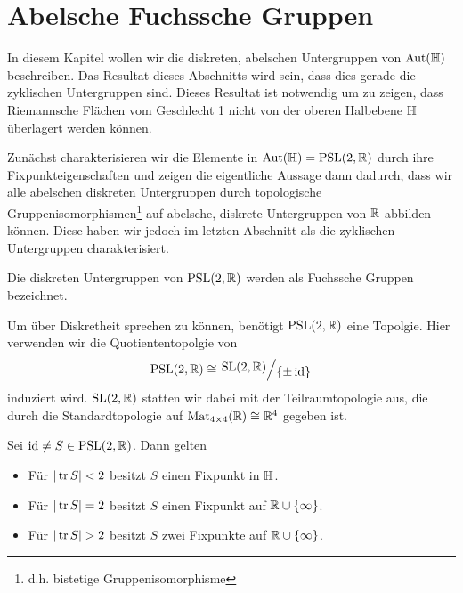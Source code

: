 
\section{Abelsche Fuchssche Gruppen}
\label{sec:fuchs}

In diesem Kapitel wollen wir die diskreten, abelschen Untergruppen von
$\operatorname{Aut}(\mathbb{H})$ beschreiben. Das Resultat dieses Abschnitts wird sein, dass
dies gerade die zyklischen Untergruppen sind. Dieses Resultat ist
notwendig um zu zeigen, dass Riemannsche Flächen vom Geschlecht 1
nicht von der oberen Halbebene $\mathbb{H}$ überlagert werden können.

Zunächst charakterisieren wir die Elemente in $\operatorname{Aut}(\mathbb{H}) = \operatorname{PSL}(2, \mathbb{R})$
durch ihre Fixpunkteigenschaften und zeigen die eigentliche Aussage
dann dadurch, dass wir alle abelschen diskreten Untergruppen durch
topologische Gruppenisomorphismen\footnote{d.h. bistetige
  Gruppenisomorphisme} auf abelsche, diskrete Untergruppen
von $\mathbb{R}$ abbilden können. Diese haben wir jedoch im letzten Abschnitt
als die zyklischen Untergruppen charakterisiert.

\begin{defin}
  Die diskreten Untergruppen von $\operatorname{PSL}(2,\mathbb{R})$ werden als Fuchssche
  Gruppen bezeichnet.
\end{defin}

\begin{rem}
  Um über Diskretheit sprechen zu können, benötigt $\operatorname{PSL}(2, \mathbb{R})$
  eine Topolgie. Hier verwenden wir die Quotiententopolgie von
  \[
  \PSL(2, \R) \cong \quot{\SL(2, \R)}{\{\pm \id\}}
  \]
  induziert wird. $\operatorname{SL}(2, \mathbb{R})$ statten wir dabei mit der
  Teilraumtopologie aus, die durch die Standardtopologie auf
  $\operatorname{Mat}_{4\times4}(\mathbb{R}) \cong \mathbb{R}^4$ gegeben ist.
\end{rem}

\begin{thm}
  \label{thm:fixpkt}
  Sei $\operatorname{id} \neq S \in \operatorname{PSL}(2, \mathbb{R})$. Dann gelten
  \begin{itemize}
  \item Für $|\operatorname{tr} S| < 2$ besitzt $S$ einen Fixpunkt in $\mathbb{H}$.
  \item Für $|\operatorname{tr} S| = 2$ besitzt $S$ einen Fixpunkt auf $\mathbb{R} \cup \{\infty\}$.
  \item Für $|\operatorname{tr} S| > 2$ besitzt $S$ zwei Fixpunkte auf $\mathbb{R} \cup \{\infty\}$.
  \end{itemize}
\end{thm}

